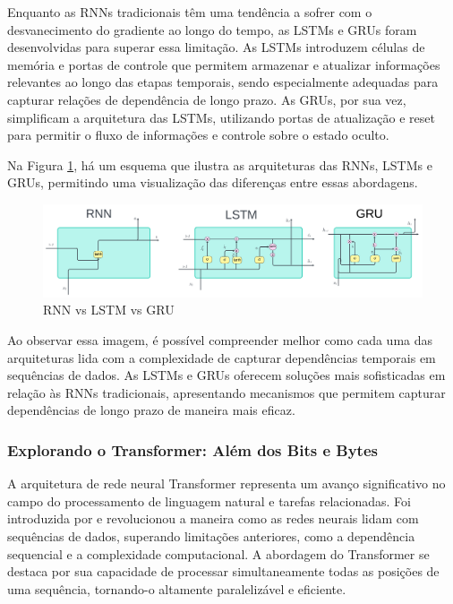 Enquanto as RNNs tradicionais têm uma tendência a sofrer com o desvanecimento do gradiente ao longo do tempo, as LSTMs e GRUs foram desenvolvidas para superar essa limitação. As LSTMs introduzem células de memória e portas de controle que permitem armazenar e atualizar informações relevantes ao longo das etapas temporais, sendo especialmente adequadas para capturar relações de dependência de longo prazo. As GRUs, por sua vez, simplificam a arquitetura das LSTMs, utilizando portas de atualização e reset para permitir o fluxo de informações e controle sobre o estado oculto.

Na Figura \ref{fig:rnn-vs-lstm-vs-gru-1024x308}, há um esquema que ilustra as arquiteturas das RNNs, LSTMs e GRUs, permitindo uma visualização das diferenças entre essas abordagens.

\begin{figure}[H]
	\centering
	\caption{RNN vs LSTM vs GRU}
	\label{fig:rnn-vs-lstm-vs-gru-1024x308}
	\includegraphics[width=1\linewidth]{Apendices/Figuras/modelagem-24h/RNN-vs-LSTM-vs-GRU-1024x308}
	
\end{figure}


Ao observar essa imagem, é possível compreender melhor como cada uma das arquiteturas lida com a complexidade de capturar dependências temporais em sequências de dados. As LSTMs e GRUs oferecem soluções mais sofisticadas em relação às RNNs tradicionais, apresentando mecanismos que permitem capturar dependências de longo prazo de maneira mais eficaz.

\subsubsection{Explorando o Transformer: Al\'em dos Bits e Bytes}

A arquitetura de rede neural Transformer representa um avanço significativo no campo do processamento de linguagem natural e tarefas relacionadas. Foi introduzida por \cite{vaswani2017attention} e revolucionou a maneira como as redes neurais lidam com sequências de dados, superando limitações anteriores, como a dependência sequencial e a complexidade computacional. A abordagem do Transformer se destaca por sua capacidade de processar simultaneamente todas as posições de uma sequência, tornando-o altamente paralelizável e eficiente.

